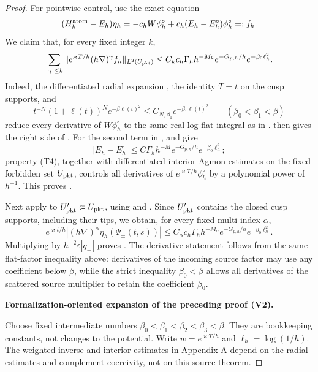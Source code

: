 \documentclass[11pt]{article}
\newcommand{\formalisationparentid}{X}
\newenvironment{formalisationaddition}[1]{\par\medskip\begingroup\color{blue}\def\formalisationparentid{#1}\setcounter{formalizationsublemma}{0}\let\lemma\formalizationsublemma\let\endlemma\endformalizationsublemma
  \def\Eo{\mathcal E_h^\circ}\def\EE{\mathcal E_h}\def\phio{\phi_h^\circ}\def\phih{\phi_h}\def\Ho{H_h^{\rm atom}(v^\circ)}\def\Ha{H_h^{\rm atom}}\def\HL{H_h^{L}}\def\Dh{D_h}\def\Log{\operatorname{Log}}\def\ellh{\ell_h}\def\Gp{G_{p,h}}\def\Ast{A_{*,h}}\def\ahat{\widehat{\mathfrak a}_h}\def\ah{\mathfrak a_h}\def\rh{\widehat\rho_h}\def\deltah{\widehat\delta_h}\def\oldref##1{\textup{(##1)}}\def\interface##1{\par\noindent\textit{Analytical interface used here.} ##1\par}\def\finish{\par\noindent\textit{Conclusion of the formalization-oriented expansion.} }\par\noindent\textbf{Formalization-oriented expansion of the preceding proof (V2).}\par\smallskip
}{\par\endgroup\medskip
}
\newcommand{\eps}{\varepsilon}
\begin{document}
\begin{proof}
For pointwise control, use the exact equation
\begin{equation}\label{eq:eta-local-equation}
 (H_h^{\rm atom}-E_h)\eta_h
 =-c_hW\phi_h^\circ+c_h(E_h-E_h^\circ)\phi_h^\circ
 =:f_h.
\end{equation}
We claim that, for every fixed integer $k$,
\begin{equation}\label{eq:eta-forcing-derivatives}
 \sum_{|\gamma|\le k}
 \|e^{\varkappa T/h}(h\nabla)^\gamma f_h\|_{L^2(U_{\rm pkt})}
 \le C_kc_h\Gamma_hh^{-M_k}e^{-G_{p,h}/h}
 e^{-\beta_0\ell_h^2}.
\end{equation}
Indeed, the differentiated radial expansion
, the identity $T=t$ on the cusp supports, and
\[
 t^{-N}(1+\ell(t))^Ne^{-\beta\ell(t)^2}
 \le C_{N,\beta_1}e^{-\beta_1\ell(t)^2}
 \qquad(\beta_0<\beta_1<\beta)
\]
reduce every derivative of $W\phi_h^\circ$ to the same real log-flat
integral as in .  
 then gives the right side of
.  For the second term in
,  and
 give
\[
 |E_h-E_h^\circ|
 \le C\Gamma_hh^{-M}e^{-G_{p,h}/h}e^{-\beta_0\ell_h^2};
\]
property \textup{(T4)}, together with differentiated interior Agmon
estimates on the fixed forbidden set $U_{\rm pkt}$, controls all derivatives
of $e^{\varkappa T/h}\phi_h^\circ$ by a polynomial power of $h^{-1}$.
This proves .

Next apply  to
$U'_{\rm pkt}\Subset U_{\rm pkt}$, using
 and .  Since
$U'_{\rm pkt}$ contains the closed cusp supports, including their tips, we
obtain, for every fixed multi-index $\alpha$,
\begin{equation}\label{eq:eta-pointwise}
 e^{\varkappa t/h}
 |(h\nabla)^\alpha\eta_h(\Psi_\pm(t,s))|
 \le C_\alpha c_h\Gamma_hh^{-M_\alpha}
 e^{-G_{p,h}/h}e^{-\beta_0\ell_h^2}.
\end{equation}
Multiplying by $h^{-2}\eps|q_\pm|$ proves
.  The derivative statement follows from the same
flat-factor inequality above: derivatives of the incoming source factor may use any
coefficient below $\beta$, while the strict inequality $\beta_0<\beta$
allows all derivatives of the scattered source multiplier to retain the
coefficient $\beta_0$.

\begin{formalisationaddition}{T3.4}
Choose fixed intermediate numbers
$\beta_0<\beta_1<\beta_2<\beta_3<\beta$. They are bookkeeping constants,
not changes to the potential. Write $w=e^{\varkappa T/h}$ and
$\ell_h=\log(1/h)$. The weighted inverse and interior estimates in
Appendix A depend on the radial estimates and complement coercivity,
not on this source theorem.


\end{formalisationaddition}
\end{proof}
\end{document}
